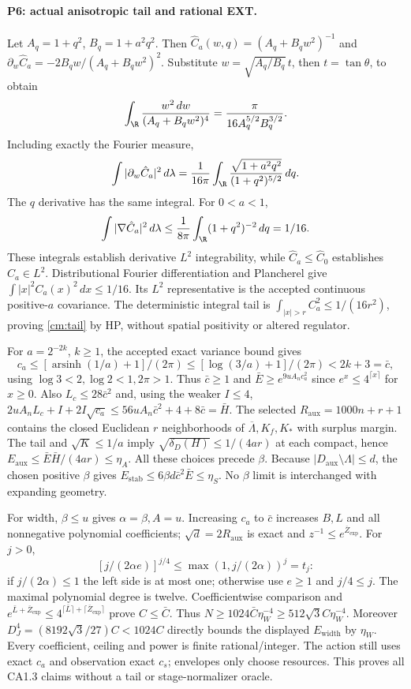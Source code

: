 \paragraph{P6: actual anisotropic tail and rational EXT.}
Let $A_q=1+q^2$, $B_q=1+a^2q^2$. Then
$\hat C_a(w,q)=(A_q+B_qw^2)^{-1}$ and
$\partial_w\hat C_a=-2B_qw/(A_q+B_qw^2)^2$.
Substitute $w=\sqrt{A_q/B_q}\,t$, then $t=\tan\theta$, to obtain
\[
 \int_\R\frac{w^2\,dw}{(A_q+B_qw^2)^4}
 =\frac{\pi}{16A_q^{5/2}B_q^{3/2}}.
\]
Including exactly the Fourier measure,
\[
 \int|\partial_w\hat C_a|^2\,d\lambda
 =\frac1{16\pi}\int_\R\frac{\sqrt{1+a^2q^2}}{(1+q^2)^{5/2}}\,dq .
\]
The $q$ derivative has the same integral. For $0<a<1$,
\[
 \int|\nabla\hat C_a|^2\,d\lambda
 \le\frac1{8\pi}\int_\R(1+q^2)^{-2}\,dq=1/16.
\]
These integrals establish derivative $L^2$ integrability, while
$\hat C_a\le\hat C_0$ establishes $\hat C_a\in L^2$.
Distributional Fourier differentiation and Plancherel give
$\int|x|^2C_a(x)^2\,dx\le1/16$. Its $L^2$ representative is the
accepted continuous positive-$a$ covariance. The deterministic integral
tail is $\int_{|x|>r}C_a^2\le1/(16r^2)$, proving \eqref{cm:tail}
by HP, without spatial positivity or altered regulator.

For $a=2^{-2k}$, $k\ge1$, the accepted exact variance bound gives
\[
 c_a\le[\operatorname{arsinh}(1/a)+1]/(2\pi)
 \le[\log(3/a)+1]/(2\pi)<2k+3=\bar c,
\]
using $\log3<2,\log2<1,2\pi>1$. Thus $\bar c\ge1$ and
$\bar E\ge e^{9uA_nc_a^2}$ since $e^x\le4^{\lceil x\rceil}$ for $x\ge0$.
Also $L_c\le28\bar c^2$ and, using the weaker $I\le4$,
$2uA_nL_c+I+2I\sqrt{c_a}\le56uA_n\bar c^2+4+8\bar c=\bar H$.
The selected $R_{\mathrm{aux}}=1000n+r+1$ contains the closed Euclidean
$r$ neighborhoods of $\overline\Lambda,K_f,K_*$ with surplus margin.
The tail and $\sqrt K\le1/a$ imply
$\sqrt{\delta_D(H)}\le1/(4ar)$ at each compact, hence
$E_{\mathrm{aux}}\le\bar E\bar H/(4ar)\le\eta_A$.
All these choices precede $\beta$.
Because $|D_{\mathrm{aux}}\setminus\Lambda|\le d$, the chosen positive
$\beta$ gives $E_{\mathrm{stab}}\le6\beta d\bar c^2\bar E\le\eta_S$.
No $\beta$ limit is interchanged with expanding geometry.

For width, $\beta\le u$ gives $\alpha=\beta,A=u$. Increasing $c_a$ to
$\bar c$ increases $B,L$ and all nonnegative polynomial coefficients;
$\sqrt d=2R_{\mathrm{aux}}$ is exact and $z^{-1}\le e^{\overline Z_{\exp}}$.
For $j>0$,
\[
 [j/(2\alpha e)]^{j/4}\le\max(1,j/(2\alpha))^j=t_j:
\]
if $j/(2\alpha)\le1$ the left side is at most one; otherwise use
$e\ge1$ and $j/4\le j$. The maximal polynomial degree is twelve.
Coefficientwise comparison and
$e^{\bar L+\overline Z_{\exp}}\le4^{\lceil\bar L\rceil+\lceil\overline Z_{\exp}\rceil}$
prove $C\le\bar C$. Thus
$N\ge1024\bar C\eta_W^{-4}\ge512\sqrt3 C\eta_W^{-4}$.
Moreover $D_J^4=(8192\sqrt3/27)C<1024C$ directly bounds the displayed
$E_{\mathrm{width}}$ by $\eta_W$. Every coefficient, ceiling and power is
finite rational/integer. The action still uses exact $c_a$ and observation
exact $c_s$; envelopes only choose resources. This proves all CA1.3
claims without a tail or stage-normalizer oracle.

